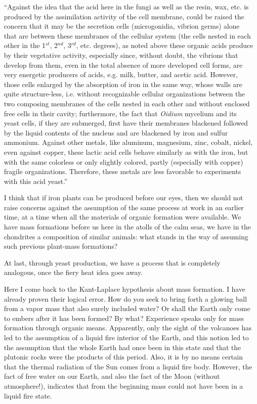 \documentclass[a4paper, 12pt, oneside]{article}
\begin{document}
``Against the idea that the acid here in the fungi as well as the resin, wax, etc. is produced by the assimilation activity of the cell membrane, could be raised the concern that it may be the secretion cells (microgonidia, vibrion germs) alone that are between these membranes of the cellular system (the cells nested in each other in the 1$^{st}$, 2$^{nd}$, 3$^{rd}$, etc. degrees), as noted above these organic acids produce by their vegetative activity, especially since, without doubt, the vibrions that develop from them, even in the total absence of more developed cell forms, are very energetic producers of acids, e.g. milk, butter, and acetic acid. However, those cells enlarged by the absorption of iron in the same way, whose walls are quite structure-less, i.e. without recognizable cellular organizations between the two composing membranes of the cells nested in each other and without enclosed free cells in their cavity; furthermore, the fact that \emph{Oidium} mycelium and its yeast cells, if they are submerged, first have their membranes blackened followed by the liquid contents of the nucleus and are blackened by iron and sulfur ammonium. Against other metals, like aluminum, magnesium, zinc, cobalt, nickel, even against copper, these lactic acid cells behave similarly as with the iron, but with the same colorless or only slightly colored, partly (especially with copper) fragile organizations. Therefore, these metals are less favorable to experiments with this acid yeast.''

I think that if iron plants can be produced before our eyes, then we should not raise concerns against the assumption of the same process at work in an earlier time, at a time when all the materials of organic formation were available. We have mass formations before us here in the atolls of the calm seas, we have in the chondrites a composition of similar animals: what stands in the way of assuming such previous plant-mass formations?

At last, through yeast production, we have a process that is completely analogous, once the fiery heat idea goes away.

Here I come back to the Kant-Laplace hypothesis about mass formation. I have already proven their logical error. How do you seek to bring forth a glowing ball from a vapor mass that also surely included water? Or shall the Earth only come to embers after it has been formed? By what? Experience speaks only for mass formation through organic means. Apparently, only the sight of the volcanoes has led to the assumption of a liquid fire interior of the Earth, and this notion led to the assumption that the whole Earth had once been in this state and that the plutonic rocks were the products of this period. Also, it is by no means certain that the thermal radiation of the Sun comes from a liquid fire body. However, the fact of free water on our Earth, and also the fact of the Moon (without atmosphere!), indicates that from the beginning mass could not have been in a liquid fire state.
\end{document}
